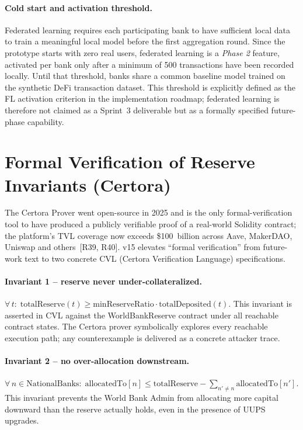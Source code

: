 \documentclass[12pt,a4paper]{report}
\begin{document}
\paragraph{Cold start and activation threshold.}
Federated learning requires each participating bank to have sufficient local data to train a meaningful local model before the first aggregation round. Since the prototype starts with zero real users, federated learning is a \textit{Phase 2} feature, activated per bank only after a minimum of 500 transactions have been recorded locally. Until that threshold, banks share a common baseline model trained on the synthetic DeFi transaction dataset. This threshold is explicitly defined as the FL activation criterion in the implementation roadmap; federated learning is therefore not claimed as a Sprint~3 deliverable but as a formally specified future-phase capability.

\section{Formal Verification of Reserve Invariants (Certora)}
\label{sec:certora}

The Certora Prover went open-source in 2025 and is the only formal-verification tool to have produced a publicly verifiable proof of a real-world Solidity contract; the platform's TVL coverage now exceeds \$100~billion across Aave, MakerDAO, Uniswap and others~[R39, R40]. v15 elevates ``formal verification'' from future-work text to two concrete CVL (Certora Verification Language) specifications.

\paragraph{Invariant 1 -- reserve never under-collateralized.}
\(\forall\, t:\; \mathrm{totalReserve}(t) \ge \mathrm{minReserveRatio} \cdot \mathrm{totalDeposited}(t).\)
This invariant is asserted in CVL against the WorldBankReserve contract under all reachable contract states. The Certora prover symbolically explores every reachable execution path; any counterexample is delivered as a concrete attacker trace.

\paragraph{Invariant 2 -- no over-allocation downstream.}
\(\forall\, n \in \mathrm{NationalBanks}:\; \mathrm{allocatedTo}[n] \le \mathrm{totalReserve} - \sum_{n' \ne n} \mathrm{allocatedTo}[n'].\)
This invariant prevents the World Bank Admin from allocating more capital downward than the reserve actually holds, even in the presence of UUPS upgrades.
\end{document}
